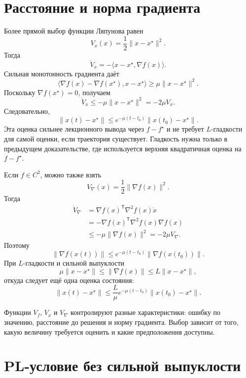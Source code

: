 \section{Расстояние и норма градиента}

Более прямой выбор функции Ляпунова равен
\[
    V_x(x)
    =
    \frac12\lVert x-x^\star\rVert^2.
\]
Тогда
\[
    \dot V_x
    =
    -\bigl\langle
        x-x^\star,
        \nabla f(x)
    \bigr\rangle.
\]
Сильная монотонность градиента даёт
\[
    \bigl\langle
        \nabla f(x)-\nabla f(x^\star),
        x-x^\star
    \bigr\rangle
    \ge
    \mu\lVert x-x^\star\rVert^2.
\]
Поскольку \(\nabla f(x^\star)=0\), получаем
\[
    \dot V_x
    \le
    -\mu\lVert x-x^\star\rVert^2
    =
    -2\mu V_x.
\]
Следовательно,
\[
    \lVert x(t)-x^\star\rVert
    \le
    e^{-\mu(t-t_0)}
    \lVert x(t_0)-x^\star\rVert.
\]
Эта оценка сильнее лекционного вывода через \(f-f^\star\) и не
требует \(L\)-гладкости для самой оценки, если траектория существует.
Гладкость нужна только в предыдущем доказательстве, где используется
верхняя квадратичная оценка на \(f-f^\star\).

Если \(f\in C^2\), можно также взять
\[
    V_{\nabla}(x)
    =
    \frac12\lVert\nabla f(x)\rVert^2.
\]
Тогда
\[
\begin{aligned}
    \dot V_{\nabla}
    &=
    \nabla f(x)^{\mathsf T}
    \nabla^2f(x)\dot x
    \\
    &=
    -\nabla f(x)^{\mathsf T}
    \nabla^2f(x)\nabla f(x)
    \\
    &\le
    -\mu\lVert\nabla f(x)\rVert^2
    =
    -2\mu V_{\nabla}.
\end{aligned}
\]
Поэтому
\[
    \lVert\nabla f(x(t))\rVert
    \le
    e^{-\mu(t-t_0)}
    \lVert\nabla f(x(t_0))\rVert.
\]
При \(L\)-гладкости и сильной выпуклости
\[
    \mu\lVert x-x^\star\rVert
    \le
    \lVert\nabla f(x)\rVert
    \le
    L\lVert x-x^\star\rVert,
\]
откуда следует ещё одна оценка состояния:
\[
    \lVert x(t)-x^\star\rVert
    \le
    \frac L\mu
    e^{-\mu(t-t_0)}
    \lVert x(t_0)-x^\star\rVert.
\]

Функции \(V_f\), \(V_x\) и \(V_{\nabla}\) контролируют разные
характеристики: ошибку по значению, расстояние до решения и норму
градиента. Выбор зависит от того, какую величину требуется оценить и
какие предположения доступны.

\section{PL-условие без сильной выпуклости}

